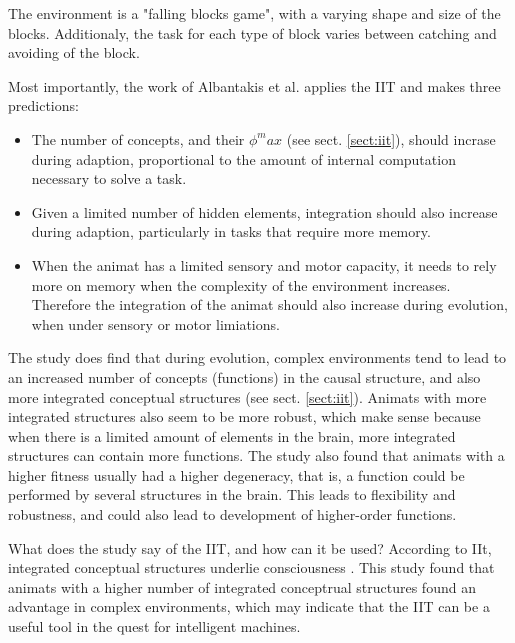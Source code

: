 The environment is a "falling blocks game", with a varying shape and size of the blocks. Additionaly, the task for each type of block varies between catching and avoiding of the block.

Most importantly, the work of Albantakis et al. applies the IIT and makes three predictions:
\begin{itemize}
\item{}
The number of concepts, and their $\phi^max$ (see sect. \vref{sect:iit}), should incrase during adaption, proportional to the amount of internal computation necessary to solve a task.
\item{}
Given a limited number of hidden elements, integration should also increase during adaption, particularly in tasks that require more memory.
\item{}
When the animat has a limited sensory and motor capacity, it needs to rely more on memory when the complexity of the environment increases. Therefore the integration of the animat should also increase during evolution, when under sensory or motor limiations.\cite{albantakis_evolution_2014}
\end{itemize}

The study does find that during evolution, complex environments tend to lead to an increased number of concepts (functions) in the causal structure, and also more integrated conceptual structures (see sect. \vref{sect:iit}).
Animats with more integrated structures also seem to be more robust, which make sense because when there is a limited amount of elements in the brain, more integrated structures can contain more functions.
The study also found that animats with a higher fitness usually had a higher degeneracy, that is, a function could be performed by several structures in the brain.
This leads to flexibility and robustness, and could also lead to development of higher-order functions.\cite{albantakis_evolution_2014}

What does the study say of the IIT, and how can it be used? According to IIt, integrated conceptual structures underlie consciousness \cite{tononi_integrated_2016}. This study found that animats with a higher number of integrated conceptrual structures found an advantage in complex environments, which may indicate that the IIT can be a useful tool in the quest for intelligent machines.





